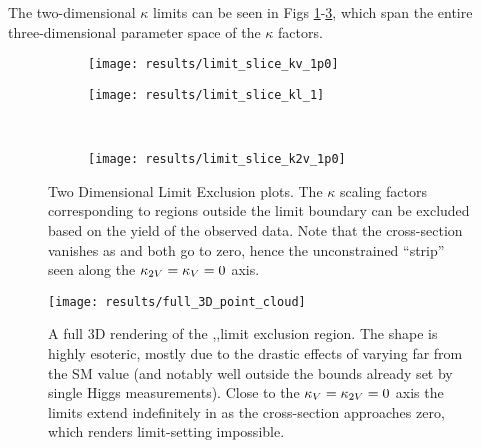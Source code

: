     The two-dimensional $\kappa$ limits can be seen in Figs \ref{fig:limit_slice_kv_1p0}-\ref{fig:limit_slice_k2v_1p0},
        which span the entire three-dimensional parameter space of the $\kappa$ factors.

    \begin{figure}[!htbp]
        \centering
        \begin{subfigure}{0.48\textwidth} 
            \texttt{[image: results/limit\_slice\_kv\_1p0]}
            \caption{}%
            \label{fig:limit_slice_kv_1p0}
        \end{subfigure}
        \begin{subfigure}{0.48\textwidth}
            \texttt{[image: results/limit\_slice\_kl\_1]}
            \caption{}%
            \label{fig:limit_slice_kl_1p0}
        \end{subfigure}\\
        \begin{subfigure}{0.48\textwidth} 
            \texttt{[image: results/limit\_slice\_k2v\_1p0]}
            \caption{}%
            \label{fig:limit_slice_k2v_1p0}
        \end{subfigure}
        \caption{
            Two Dimensional Limit Exclusion plots.
            The $\kappa$ scaling factors corresponding to regions outside the limit boundary
                can be excluded based on the yield of the observed data.
            Note that the \vbfproc cross-section vanishes as \kvv and \kv both go to zero,
                hence the unconstrained ``strip'' seen along the $\kappa_{2V} = \kappa_{V} = 0$ axis.
        }
        \label{fig:limit_slices}
    \end{figure}

    \begin{figure}[!htbp]
        \centering
        \texttt{[image: results/full\_3D\_point\_cloud]}
        \label{fig:full_3D_point_cloud}
        \caption{
            A full 3D rendering of the \kvv,\kl,\kv limit exclusion region.
            The shape is highly esoteric, mostly due to the drastic effects of varying \kv far from the SM value
                (and notably well outside the bounds already set by single Higgs measurements).
            Close to the $\kappa_{V} = \kappa_{2V} = 0$ axis the limits extend indefinitely in \kl
                as the cross-section approaches zero,
                which renders limit-setting impossible.
        }
    \end{figure}

